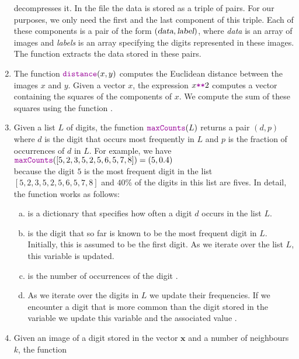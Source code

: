 \begin{enumerate}
      decompresses it.  In the file  the data is stored as a triple of pairs.
      For our purposes, we only need the first and the last component of this triple.  Each of these components
      is a pair of the form $(\textsl{data}, \textsl{label})$, where \textsl{data} is an array of images and
      \textsl{labels} is an array specifying the digits represented in these images.
      The function  extracts the data stored in these pairs.
\item The function $\mytt{distance}(x, y)$ computes the Euclidean distance between the images $x$ and $y$.
      Given a vector $x$, the expression $x \mytt{**} 2$ computes a vector containing the squares of the
      components of $x$.  We compute the sum of these squares using the  function .
\item Given a list $L$ of digits, the function $\mytt{maxCounts}(L)$ returns a pair $(d, p)$ where $d$ is the digit that occurs most frequently in $L$
      and $p$ is the fraction of occurrences of $d$ in $L$.  For example, we have
      \\[0.2cm]
      \hspace*{1.3cm}
      $\mytt{maxCounts}([5,2,3,5,2,5,6,5,7,8]) = (5, 0.4)$
      \\[0.2cm]
      because the digit $5$ is the most frequent digit in the list $[5,2,3,5,2,5,6,5,7,8]$ and $40$\%
      of the digits in this list are fives.  In detail, the function  works as follows:
      \begin{enumerate}[(a)]
      \item {} is a dictionary that specifies how often a digit $d$ occurs in the list $L$.
      \item {} is the digit that so far is known to be the most frequent digit in $L$.
            Initially, this is assumed to be the first digit.  As we iterate over the list $L$, this variable
            is updated.
      \item {} is the number of occurrences of the digit .
      \item As we iterate over the digits in $L$ we update their frequencies.  If we encounter a digit that is
            more common than the digit stored in the variable  we update this variable
            and the associated value .
      \end{enumerate}
\item Given an image of a digit stored in the vector $\mathbf{x}$ and a number of neighbours $k$, the function

\end{enumerate}
